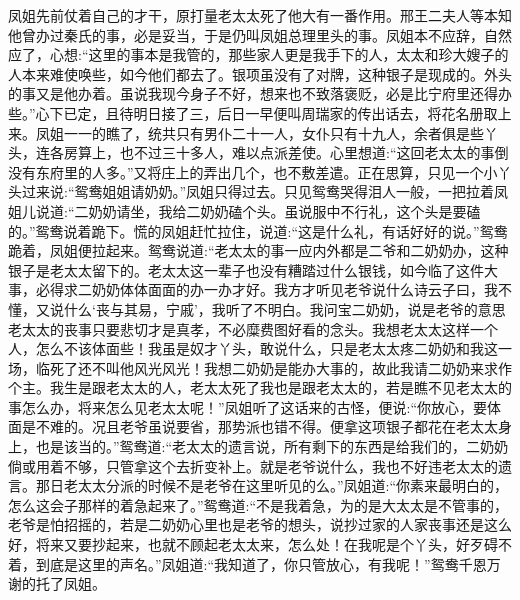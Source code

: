 \begin{parag}
    凤姐先前仗着自己的才干，原打量老太太死了他大有一番作用。邢王二夫人等本知他曾办过秦氏的事，必是妥当，于是仍叫凤姐总理里头的事。凤姐本不应辞，自然应了，心想:“这里的事本是我管的，那些家人更是我手下的人，太太和珍大嫂子的人本来难使唤些，如今他们都去了。银项虽没有了对牌，这种银子是现成的。外头的事又是他办着。虽说我现今身子不好，想来也不致落褒贬，必是比宁府里还得办些。”心下已定，且待明日接了三，后日一早便叫周瑞家的传出话去，将花名册取上来。凤姐一一的瞧了，统共只有男仆二十一人，女仆只有十九人，余者俱是些丫头，连各房算上，也不过三十多人，难以点派差使。心里想道:“这回老太太的事倒没有东府里的人多。”又将庄上的弄出几个，也不敷差遣。正在思算，只见一个小丫头过来说:“鸳鸯姐姐请奶奶。”凤姐只得过去。只见鸳鸯哭得泪人一般，一把拉着凤姐儿说道:“二奶奶请坐，我给二奶奶磕个头。虽说服中不行礼，这个头是要磕的。”鸳鸯说着跪下。慌的凤姐赶忙拉住，说道:“这是什么礼，有话好好的说。”鸳鸯跪着，凤姐便拉起来。鸳鸯说道:“老太太的事一应内外都是二爷和二奶奶办，这种银子是老太太留下的。老太太这一辈子也没有糟踏过什么银钱，如今临了这件大事，必得求二奶奶体体面面的办一办才好。我方才听见老爷说什么诗云子曰，我不懂，又说什么‘丧与其易，宁戚’，我听了不明白。我问宝二奶奶，说是老爷的意思老太太的丧事只要悲切才是真孝，不必糜费图好看的念头。我想老太太这样一个人，怎么不该体面些！我虽是奴才丫头，敢说什么，只是老太太疼二奶奶和我这一场，临死了还不叫他风光风光！我想二奶奶是能办大事的，故此我请二奶奶来求作个主。我生是跟老太太的人，老太太死了我也是跟老太太的，若是瞧不见老太太的事怎么办，将来怎么见老太太呢！”凤姐听了这话来的古怪，便说:“你放心，要体面是不难的。况且老爷虽说要省，那势派也错不得。便拿这项银子都花在老太太身上，也是该当的。”鸳鸯道:“老太太的遗言说，所有剩下的东西是给我们的，二奶奶倘或用着不够，只管拿这个去折变补上。就是老爷说什么，我也不好违老太太的遗言。那日老太太分派的时候不是老爷在这里听见的么。”凤姐道:“你素来最明白的，怎么这会子那样的着急起来了。”鸳鸯道:“不是我着急，为的是大太太是不管事的，老爷是怕招摇的，若是二奶奶心里也是老爷的想头，说抄过家的人家丧事还是这么好，将来又要抄起来，也就不顾起老太太来，怎么处！在我呢是个丫头，好歹碍不着，到底是这里的声名。”凤姐道:“我知道了，你只管放心，有我呢！”鸳鸯千恩万谢的托了凤姐。
\end{parag}


